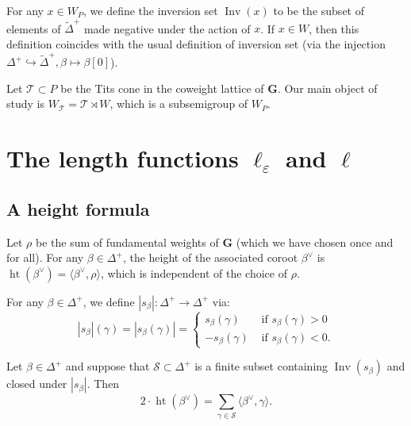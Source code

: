\documentclass[ALCO,ThmDefs,Unicode]{cedram}
\DeclareMathOperator{\height}{ht}
\DeclareMathOperator{\Inv}{Inv}
\newcommand{\betacheck}{\beta^\vee}
\newcommand{\bG}{\mathbf{G}}
\newcommand{\cS}{\mathcal{S}}
\newcommand{\cT}{\mathcal{T}}
\newcommand{\WTits}{W_{\TitsCone}}
\newcommand{\TitsCone}{\cT}
\newcommand{\textif}{\text{ if }}
\newcommand{\tDelta}{\widetilde{\Delta}}
\begin{document}
For any $x\in W_P$, we define the inversion set $\Inv(x)$ to be the subset of elements of $\tDelta^+$ made negative under the action of $x$. If $x \in W$, then this definition coincides with the usual definition of inversion set (via the injection $\Delta^+\hookrightarrow\tDelta^+,\beta\mapsto\beta[0]$).

Let $\TitsCone\subset P$ be the Tits cone in the coweight lattice of $\bG$. Our main object of study is $\WTits=\TitsCone\rtimes W$, which is a subsemigroup of $W_P$.


\section{The length functions \texorpdfstring{$\ell_\varepsilon$}{ell varepsilon} and \texorpdfstring{$\ell$}{ell}}

\subsection{A height formula}

Let $\rho$ be the sum of fundamental weights of $\bG$ (which we have chosen once and for all). For any $\beta\in\Delta^+$, the height of the associated coroot $\betacheck$ is $\height(\betacheck) = \langle \betacheck,\rho \rangle$, which is independent of the choice of $\rho$.

For any $\beta\in\Delta^+$, we define $|s_\beta| : \Delta^+ \rightarrow \Delta^+$ via:
\begin{equation}\label{eq:040}
|s_\beta| (\gamma) = | s_\beta(\gamma) | =
\begin{cases}
s_\beta(\gamma) & \textif s_\beta(\gamma) > 0 \\
-s_\beta(\gamma) & \textif s_\beta(\gamma) < 0.
\end{cases}
\end{equation}

\begin{prop}\label{prop-the-height-formula}
Let $\beta\in\Delta^+$ and suppose that $\cS \subset \Delta^+$ is a finite subset containing $\Inv(s_\beta)$ and closed under $|s_\beta|$. Then
\begin{equation}
2 \cdot \height(\betacheck) = \sum_{\gamma \in \cS} \langle \betacheck, \gamma \rangle.
\end{equation}
\end{prop}
\end{document}

